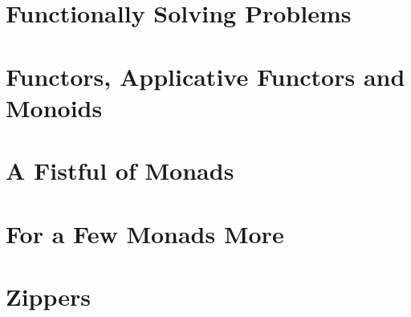 \documentclass[UTF8]{ctexart}
\begin{document}
\section{Functionally Solving Problems}

\newpage

\section{Functors, Applicative Functors and Monoids}

\newpage

\section{A Fistful of Monads}

\newpage

\section{For a Few Monads More}

\newpage

\section{Zippers}

\newpage
\end{document}

